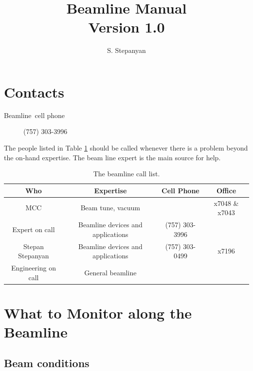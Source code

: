 \documentclass[12pt]{article}
\newcommand{\versionnumber}{1.0}
\begin{document}
\title{Beamline Manual\\\normalsize Version \versionnumber}
\author{S. Stepanyan}
\maketitle



\section{Contacts\label{beamline_contacts}}

\begin{description}
\item [Beamline~cell phone] (757) 303-3996
\end{description}

The people listed in Table \ref{tab:calllist} should be called whenever there
is a problem beyond the on-hand expertise. The beam line expert is the main source for help.  
\begin{table}[tbhp]
\vspace{0.3cm}
{\centering \begin{tabular}{|c|c|c|c|}
\hline 
Who&Expertise&Cell Phone&Office\\
\hline 
\hline 
MCC&Beam tune, vacuum&&x7048 \& x7043\\
\hline 
Expert on call&Beamline devices and applications&(757) 303-3996&\\
\hline 
Stepan Stepanyan&Beamline devices and applications&(757) 303-0499&x7196\\
\hline 
Engineering on call&General beamline&&\\
\hline 
\end{tabular}\par}
\vspace{0.3cm}


\caption{The beamline call list.\label{tab:calllist}}
\end{table} 



\section{What to Monitor along the Beamline}


\subsection{Beam conditions}
\indent
\end{document}
